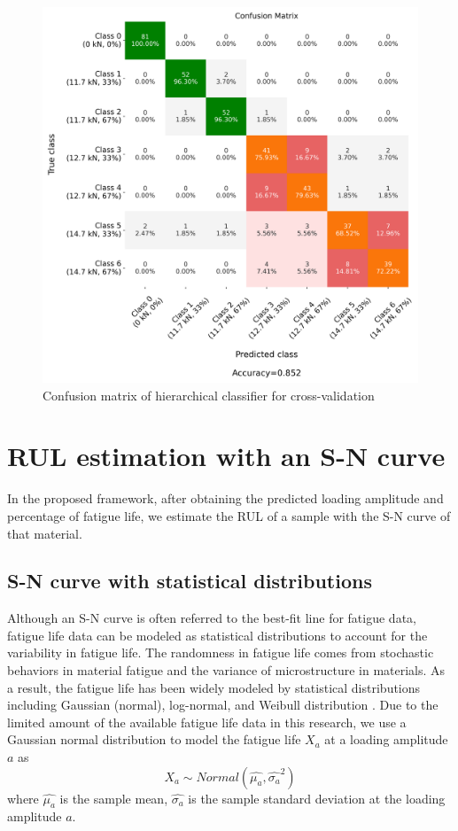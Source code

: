 \begin{figure}[tb]
    \includegraphics[width=\linewidth]{fig/hierarchical_confusion_matrix.png}
    \caption{Confusion matrix of hierarchical classifier for cross-validation}
    \label{fig: confu mat hier}
\end{figure}


\section{RUL estimation with an S-N curve}
In the proposed framework, after obtaining the predicted loading amplitude and percentage of fatigue life, we estimate the RUL of a sample with the S-N curve of that material.

\subsection{S-N curve with statistical distributions}
\label{subsec: statistical sn curve}
Although an S-N curve is often referred to the best-fit line for fatigue data, fatigue life data can be modeled as statistical distributions to account for the variability in fatigue life. The randomness in fatigue life comes from stochastic behaviors in material fatigue and the variance of microstructure in materials. As a result, the fatigue life has been widely modeled by statistical distributions including Gaussian (normal), log-normal, and Weibull distribution \cite{sn-curve-statistical-model-LI2016}. Due to the limited amount of the available fatigue life data in this research, we use a Gaussian normal distribution to model the fatigue life $X_a$ at a loading amplitude $a$ as
\begin{equation}
    X_a \sim Normal(\hat{\mu_{a}}, \hat{\sigma_{a}}^2)
\end{equation}
where $\hat{\mu_{a}}$ is the sample mean, $\hat{\sigma_{a}}$ is the sample standard deviation at the loading amplitude $a$.

